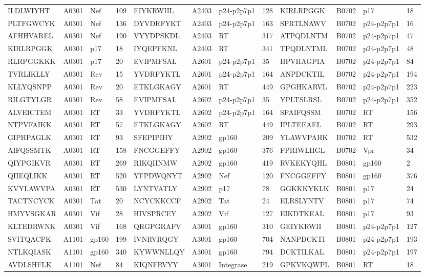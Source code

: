 \begin{table}[htp]
\begin{center}
\begin{sideways}
{\begin{tabulary}{1.5\textwidth}{|l|l|l|l|l|l|l|l|l|l|l|l|}
ILDLWIYHT & A0301 & Nef & 109 & EIYKRWIIL & A2403 & p24-p2p7p1 & 128 & KIRLRPGGK & B0702 & p17 & 18 \\
PLTFGWCYK & A0301 & Nef & 136 & DYVDRFYKT & A2403 & p24-p2p7p1 & 163 & SPRTLNAWV & B0702 & p24-p2p7p1 & 16 \\
AFHHVAREL & A0301 & Nef & 190 & VYYDPSKDL & A2403 & RT & 317 & ATPQDLNTM & B0702 & p24-p2p7p1 & 47 \\
KIRLRPGGK & A0301 & p17 & 18 & IYQEPFKNL & A2403 & RT & 341 & TPQDLNTML & B0702 & p24-p2p7p1 & 48 \\
RLRPGGKKK & A0301 & p17 & 20 & EVIPMFSAL & A2601 & p24-p2p7p1 & 35 & HPVHAGPIA & B0702 & p24-p2p7p1 & 84 \\
TVRLIKLLY & A0301 & Rev & 15 & YVDRFYKTL & A2601 & p24-p2p7p1 & 164 & ANPDCKTIL & B0702 & p24-p2p7p1 & 194 \\
KLLYQSNPP & A0301 & Rev & 20 & ETKLGKAGY & A2601 & RT & 449 & GPGHKARVL & B0702 & p24-p2p7p1 & 223 \\
RILGTYLGR & A0301 & Rev & 58 & EVIPMFSAL & A2602 & p24-p2p7p1 & 35 & YPLTSLRSL & B0702 & p24-p2p7p1 & 352 \\
ALVEICTEM & A0301 & RT & 33 & YVDRFYKTL & A2602 & p24-p2p7p1 & 164 & SPAIFQSSM & B0702 & RT & 156 \\
NTPVFAIKK & A0301 & RT & 57 & ETKLGKAGY & A2602 & RT & 449 & IPLTEEAEL & B0702 & RT & 293 \\
GIPHPAGLK & A0301 & RT & 93 & SFEPIPIHY & A2902 & gp160 & 209 & YLAWVPAHK & B0702 & RT & 532 \\
AIFQSSMTK & A0301 & RT & 158 & FNCGGEFFY & A2902 & gp160 & 376 & FPRIWLHGL & B0702 & Vpr & 34 \\
QIYPGIKVR & A0301 & RT & 269 & RIKQIINMW & A2902 & gp160 & 419 & RVKEKYQHL & B0801 & gp160 & 2 \\
QIIEQLIKK & A0301 & RT & 520 & YFPDWQNYT & A2902 & Nef & 120 & FNCGGEFFY & B0801 & gp160 & 376 \\
KVYLAWVPA & A0301 & RT & 530 & LYNTVATLY & A2902 & p17 & 78 & GGKKKYKLK & B0801 & p17 & 24 \\
TACTNCYCK & A0301 & Tat & 20 & NCYCKKCCF & A2902 & Tat & 24 & ELRSLYNTV & B0801 & p17 & 74 \\
HMYVSGKAR & A0301 & Vif & 28 & HIVSPRCEY & A2902 & Vif & 127 & EIKDTKEAL & B0801 & p17 & 93 \\
KLTEDRWNK & A0301 & Vif & 168 & QRGPGRAFV & A3001 & gp160 & 310 & GEIYKRWII & B0801 & p24-p2p7p1 & 127 \\
SVITQACPK & A1101 & gp160 & 199 & IVNRVRQGY & A3001 & gp160 & 704 & NANPDCKTI & B0801 & p24-p2p7p1 & 193 \\
NTLKQIASK & A1101 & gp160 & 340 & KYWWNLLQY & A3001 & gp160 & 794 & DCKTILKAL & B0801 & p24-p2p7p1 & 197 \\
AVDLSHFLK & A1101 & Nef & 84 & KIQNFRVYY & A3001 & Integrase & 219 & GPKVKQWPL & B0801 & RT & 18 \bigstrut[b] \\
\hline
\end{tabulary}
}
\end{sideways}
\end{center}
\end{table}

